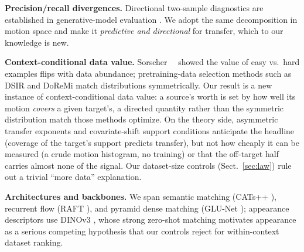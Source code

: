 \noindent\textbf{Precision/recall divergences.}
Directional two-sample diagnostics are established in generative-model
evaluation \cite{sajjadi2018assessing_precision_recall,
kynkaanniemi2019improved_pr,naeem2020reliable,alaa2022faithful}. We adopt the
same decomposition in motion space and make it \emph{predictive and
directional} for transfer, which to our knowledge is new.

\noindent\textbf{Context-conditional data value.}
Sorscher~\etal~\cite{sorscher2022beyond} showed the value of easy vs.\ hard
examples flips with data abundance; pretraining-data selection methods such
as DSIR \cite{xie2023data} and DoReMi \cite{xie2023doremi} match
distributions symmetrically. Our result is a new instance of
context-conditional data value: a source's worth is set by how well its motion
\emph{covers} a given target's, a directed quantity rather than the symmetric
distribution match those methods optimize. On the theory side, asymmetric transfer
exponents \cite{hanneke2019value} and covariate-shift support conditions \cite{bendavid2010theory} anticipate
the headline (coverage of the target's support predicts transfer), but not how
cheaply it can be measured (a crude motion histogram, no training) or that the
off-target half carries almost none of the signal. Our dataset-size controls
(Sect.~\ref{sec:law}) rule out a trivial ``more data'' explanation.

\noindent\textbf{Architectures and backbones.}
We span semantic matching (CATs++ \cite{cho2022cats++}), recurrent flow (RAFT
\cite{teed2020raft}), and pyramid dense matching (GLU-Net
\cite{truong2020glunet}); appearance descriptors use DINOv3
\cite{simeoni2025dinov3}, whose strong zero-shot matching
\cite{sd_dino_tale_of_two_features} motivates appearance as a serious
competing hypothesis that our controls reject for within-context dataset
ranking.

